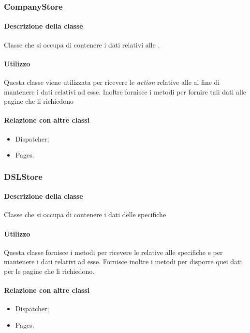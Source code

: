 \subsubsection{CompanyStore}
\paragraph*{Descrizione della classe}
Classe che si occupa di contenere i dati relativi alle .
\paragraph*{Utilizzo}
Questa classe viene utilizzata per ricevere le \textit{action} relative alle  al fine di mantenere i dati relativi ad esse. Inoltre fornisce i metodi per fornire tali dati alle pagine che li richiedono
\paragraph*{Relazione con altre classi}
\begin{itemize}
\item Dispatcher;
\item Pages.
\end{itemize}

\subsubsection{DSLStore}
\paragraph*{Descrizione della classe}
Classe che si occupa di contenere i dati delle specifiche 
\paragraph*{Utilizzo}
Questa classe fornisce i metodi per ricevere le  relative alle specifiche  e per mantenere i dati relativi ad esse. Fornisce inoltre i metodi per disporre quei dati per le pagine che li richiedono.
\paragraph*{Relazione con altre classi}
\begin{itemize}
\item Dispatcher;
\item Pages.
\end{itemize}


